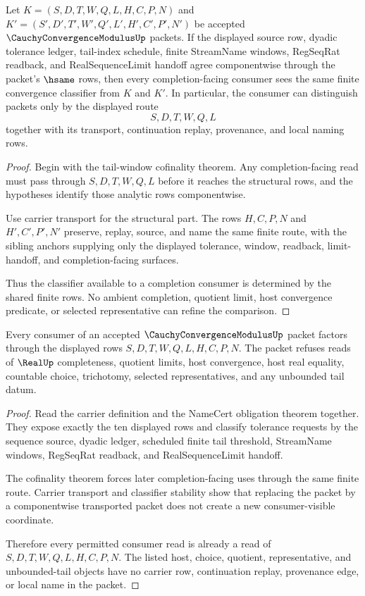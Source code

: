 \begin{theorem}
\label{thm:cauchy-convergence-modulus-classifier-stability}
Let $K=(S,D,T,W,Q,L,H,C,P,N)$ and $K'=(S',D',T',W',Q',L',H',C',P',N')$ be accepted $\CauchyConvergenceModulusUp$ packets. If the displayed source row, dyadic tolerance ledger, tail-index schedule, finite StreamName windows, RegSeqRat readback, and RealSequenceLimit handoff agree componentwise through the packet's $\hsame$ rows, then every completion-facing consumer sees the same finite convergence classifier from $K$ and $K'$. In particular, the consumer can distinguish packets only by the displayed route
$$
S,D,T,W,Q,L
$$
together with its transport, continuation replay, provenance, and local naming rows.
\end{theorem}
\begin{proof}
Begin with the tail-window cofinality theorem. Any completion-facing read must pass through $S,D,T,W,Q,L$ before it reaches the structural rows, and the hypotheses identify those analytic rows componentwise.

Use carrier transport for the structural part. The rows $H,C,P,N$ and $H',C',P',N'$ preserve, replay, source, and name the same finite route, with the sibling anchors supplying only the displayed tolerance, window, readback, limit-handoff, and completion-facing surfaces.

Thus the classifier available to a completion consumer is determined by the shared finite rows. No ambient completion, quotient limit, host convergence predicate, or selected representative can refine the comparison.
\end{proof}

\begin{theorem}
\label{thm:cauchy-convergence-modulus-ledger-refusal}
Every consumer of an accepted $\CauchyConvergenceModulusUp$ packet factors through the displayed rows $S,D,T,W,Q,L,H,C,P,N$. The packet refuses reads of $\RealUp$ completeness, quotient limits, host convergence, host real equality, countable choice, trichotomy, selected representatives, and any unbounded tail datum.
\end{theorem}
\begin{proof}
Read the carrier definition and the NameCert obligation theorem together. They expose exactly the ten displayed rows and classify tolerance requests by the sequence source, dyadic ledger, scheduled finite tail threshold, StreamName windows, RegSeqRat readback, and RealSequenceLimit handoff.

The cofinality theorem forces later completion-facing uses through the same finite route. Carrier transport and classifier stability show that replacing the packet by a componentwise transported packet does not create a new consumer-visible coordinate.

Therefore every permitted consumer read is already a read of $S,D,T,W,Q,L,H,C,P,N$. The listed host, choice, quotient, representative, and unbounded-tail objects have no carrier row, continuation replay, provenance edge, or local name in the packet.
\end{proof}

